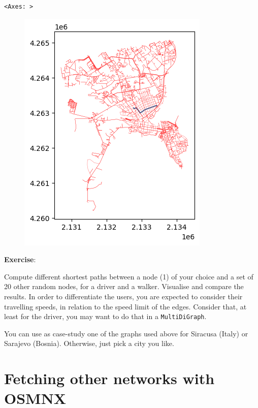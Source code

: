 \documentclass[
  letterpaper,
  DIV=11,
  numbers=noendperiod]{scrreprt}
\begin{document}
\begin{verbatim}
<Axes: >
\end{verbatim}

\begin{figure}[H]

{\centering \includegraphics{labs/w07_OSM_files/figure-pdf/cell-38-output-2.png}

}

\end{figure}

\textbf{Exercise}:

Compute different shortest paths between a node (1) of your choice and a
set of 20 other random nodes, for a driver and a walker. Visualise and
compare the results. In order to differentiate the users, you are
expected to consider their travelling speeds, in relation to the speed
limit of the edges. Consider that, at least for the driver, you may want
to do that in a \texttt{MultiDiGraph}.

You can use as case-study one of the graphs used above for Siracusa
(Italy) or Sarajevo (Bosnia). Otherwise, just pick a city you like.

\hypertarget{fetching-other-networks-with-osmnx}{%
\section{Fetching other networks with
OSMNX}\label{fetching-other-networks-with-osmnx}}
\end{document}
